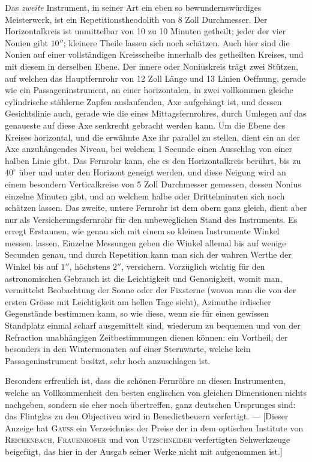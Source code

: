 \par\indent Das \emph{zweite} Instrument, in seiner Art ein eben so bewundernswürdiges Meisterwerk, ist ein Repetitionstheodolith von 8 Zoll Durchmesser. Der Horizontalkreis ist unmittelbar von 10 zu 10 Minuten getheilt; jeder der vier Nonien gibt $10''$; kleinere Theile lassen sich noch schätzen. Auch hier sind die Nonien auf einer vollständigen Kreisscheibe innerhalb des getheilten Kreises, und mit diesem in derselben Ebene. Der innere oder Noniuskreis trägt zwei Stützen, auf welchen das Hauptfernrohr von 12 Zoll Länge und 13 Linien Oeffnung, gerade wie ein Passageninstrument, an einer horizontalen, in zwei vollkommen gleiche cylindrische stählerne Zapfen auslaufenden, Axe aufgehängt ist, und dessen Gesichtslinie auch, gerade wie die eines Mittagsfernrohres, durch Umlegen auf das genaueste auf diese Axe senkrecht gebracht werden kann. Um die Ebene des Kreises horizontal, und die erwähnte Axe ihr parallel zu stellen, dient ein an der Axe anzuhängendes Niveau, bei welchem 1 Secunde einen Ausschlag von einer halben Linie gibt. Das Fernrohr kann, ehe es den Horizontalkreis berührt, bis zu $40^\circ$ über und unter den Horizont geneigt werden, und diese Neigung wird an einem besondern Verticalkreise von 5 Zoll Durchmesser gemessen, dessen Nonius einzelne Minuten gibt, und an welchem halbe oder Drittelminuten sich noch schätzen lassen. Das zweite, untere Fernrohr ist dem obern ganz gleich, dient aber nur als Versicherungsfernrohr für den unbeweglichen Stand des Instruments. Es erregt Erstaunen, wie genau sich mit einem so kleinen Instrumente Winkel messen. lassen. Einzelne Messungen geben die Winkel allemal bis auf wenige Secunden genau, und durch Repetition kann man sich der wahren Werthe der Winkel bis auf $1''$, höchstens $2''$, versichern. Vorzüglich wichtig für den astronomischen Gebrauch ist die Leichtigkeit und Genauigkeit, womit man, vermittelst Beobachtung der Sonne oder der Fixsterne (wovon man die von der ersten Grösse mit Leichtigkeit am hellen Tage sieht), Azimuthe irdischer Gegenstände bestimmen kann, so wie diese, wenn sie für einen gewissen Standplatz einmal scharf ausgemittelt sind, wiederum zu bequemen und von der Refraction unabhängigen Zeitbestimmungen dienen können: ein Vortheil, der besonders in den Wintermonaten auf einer Sternwarte, welche kein Passageninstrument besitzt, sehr hoch anzuschlagen ist.

\par\indent Besonders erfreulich ist, dass die schönen Fernröhre an diesen Instrumenten, welche an Vollkommenheit den besten englischen von gleichen Dimensionen nichts nachgeben, sondern sie eher noch übertreffen, ganz deutschen Ursprunges sind: das Flintglas zu den Objectiven wird in Benedictbeuern verfertigt. --- [Dieser Anzeige hat \textsc{Gauss} ein Verzeichniss der Preise der in dem optischen Institute von \textsc{Reichenbach}, \textsc{Frauenhofer} und von \textsc{Utzschneider} verfertigten Sehwerkzeuge beigefügt, das hier in der Ausgab seiner Werke nicht mit aufgenommen ist.]

